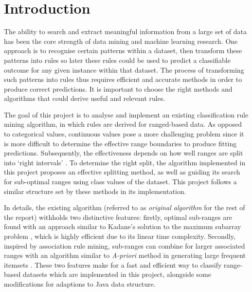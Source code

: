 \chapter{Introduction}

The ability to search and extract meaningful information from a large set of data has been the core strength of data mining and machine learning research. One approach is to recognise certain patterns within a dataset, then transform these patterns into rules so later these rules could be used to predict a classifiable outcome for any given instance within that dataset. The process of transforming such patterns into rules thus requires efficient and accurate methods in order to produce correct predictions. It is important to choose the right methods and algorithms that could derive useful and relevant rules. 

\bigskip

The goal of this project is to analyse and implement an existing classification rule mining algorithm, in which rules are derived for ranged-based data. As opposed to categorical values, continuous values pose a more challenging problem since it is more difficult to determine the effective range boundaries to produce fitting predictions. Subsequently, the effectiveness depends on how well ranges are split into `right intervals' \cite{srikant}. To determine the right split, the algorithm implemented in this project proposes an effective splitting method, as well as guiding its search for sub-optimal ranges using class values of the dataset. This project follows a similar  structure set by these methods in its implementation.

\bigskip

In details, the existing algorithm (referred to as \textit{original algorithm} for the rest of the report) withholds two distinctive features: firstly, optimal sub-ranges are found with an approach similar to Kadane's solution to the maximum subarray problem \cite{kadane}, which is highly efficient due to its linear time complexity. Secondly, inspired by association rule mining, sub-ranges can combine for larger associated ranges with an algorithm similar to \textit{A-priori} method in generating large frequent itemsets \cite{apriori}. These two features make for a fast and efficient way to classify range-based datasets which are implemented in this project, alongside some modifications for adaptions to Java data structure.





